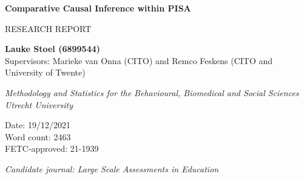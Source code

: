 \begin{titlepage}
   \begin{center}
       \vspace*{1cm}
       
       \huge
       \textbf{Comparative Causal Inference within PISA}
       
       \Large
       \vspace{0.5cm}
        RESEARCH REPORT
            
       \vspace{1.5cm}

       \textbf{Lauke Stoel (6899544)}\\
       
       \vspace{0.5cm}
       Supervisors: Marieke van Onna (CITO) and \newline
       Remco Feskens (CITO and University of Twente)

       \vfill
       
       \large     
       \textit{Methodology and Statistics for the Behavioural, Biomedical and Social Sciences}\\
       
       \vspace{0.5cm}
       \textit{Utrecht University}\\
            
       \vspace{0.8cm}
       
       Date: 19/12/2021 \\
       Word count: 2463 \\
       
       \vspace{0.5cm}
       FETC-approved: 21-1939\\
       
       \vfill
       
       \textit{Candidate journal: Large Scale Assessments in Education}
       
       
            
   \end{center}
\end{titlepage}